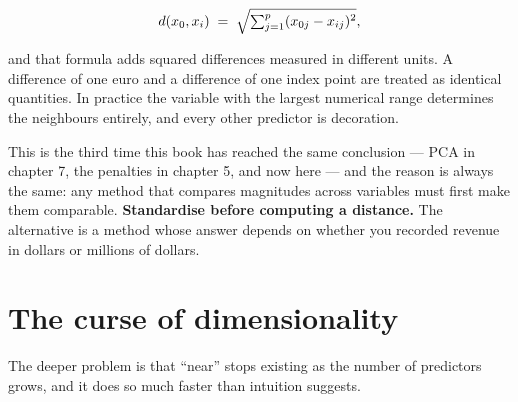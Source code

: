 \documentclass[
  letterpaper,
  10pt,
  twoside,
  openright,
  numbers=noenddot,
  chapterprefix=true]{scrbook}
\begin{document}
\[
d(x_0, x_i) \thickspace=\thickspace \sqrt{\textstyle\sum_{j=1}^{p} (x_{0j} - x_{ij})^2},
\]

and that formula adds squared differences measured in different units. A
difference of one euro and a difference of one index point are treated
as identical quantities. In practice the variable with the largest
numerical range determines the neighbours entirely, and every other
predictor is decoration.

This is the third time this book has reached the same conclusion --- PCA
in chapter 7, the penalties in chapter 5, and now here --- and the
reason is always the same: any method that compares magnitudes across
variables must first make them comparable. \textbf{Standardise before
computing a distance.} The alternative is a method whose answer depends
on whether you recorded revenue in dollars or millions of dollars.

\section{The curse of dimensionality}\label{the-curse-of-dimensionality}

The deeper problem is that ``near'' stops existing as the number of
predictors grows, and it does so much faster than intuition suggests.
\end{document}
